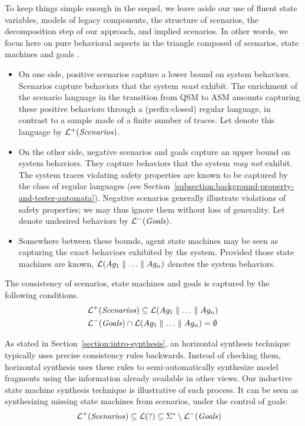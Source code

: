 To keep things simple enough in the sequel, we leave aside our use of fluent state variables, models of legacy components, the structure of scenarios, the decomposition step of our approach, and implied scenarios. In other words, we focus here on pure behavioral aspects in the triangle composed of scenarios, state machines and goals \cite{Damas:2006, Uchitel:2007}.
\begin{itemize}
\item On one side, positive scenarios capture a lower bound on system behaviors. Scenarios capture behaviors that the system \emph{must} exhibit. The enrichment of the scenario language in the transition from QSM to ASM amounts capturing these positive behaviors through a (prefix-closed) regular language, in contrast to a sample made of a finite number of traces. Let denote this language by $\mathcal{L}^+(\mbox{\emph{Scenarios}})$. 
\item On the other side, negative scenarios and goals capture an upper bound on system behaviors. They capture behaviors that the system \emph{may not} exhibit. The system traces violating safety properties are known to be captured by the class of regular languages (see Section~\ref{subsection:background-property-and-tester-automata}). Negative scenarios generally illustrate violations of safety properties; we may thus ignore them without loss of generality. Let denote undesired behaviors by $\mathcal{L}^-(\mbox{\emph{Goals}})$.
\item Somewhere between these bounds, agent state machines may be seen as capturing the exact behaviors exhibited by the system. Provided those state machines are known, $\mathcal{L}(Ag_1 \parallel \ldots \parallel Ag_n)$ denotes the system behaviors. 
\end{itemize}

The consistency of scenarios, state machines and goals is captured by the following conditions.
\begin{align*}
&\mathcal{L}^+(\mbox{\emph{Scenarios}}) \subseteq \mathcal{L}(Ag_1 \parallel \ldots \parallel Ag_n) \\
&\mathcal{L}^-(\mbox{\emph{Goals}}) \cap \mathcal{L}(Ag_1 \parallel \ldots \parallel Ag_n) = \emptyset
\end{align*}

As stated in Section~\ref{section:intro-synthesis}, an horizontal synthesis technique typically uses precise consistency rules backwards. Instead of checking them, horizontal synthesis uses these rules to semi-automatically synthesize model fragments using the information already available in other views. Our inductive state machine synthesis technique is illustrative of such process. It can be seen as synthesizing missing state machines from scenarios, under the control of goals:
\begin{align*}
&\mathcal{L}^+(\mbox{\emph{Scenarios}}) \subseteq \mathcal{L}(?) \subseteq  \Sigma^* \setminus \mathcal{L}^-(\mbox{\emph{Goals}})
\end{align*}

